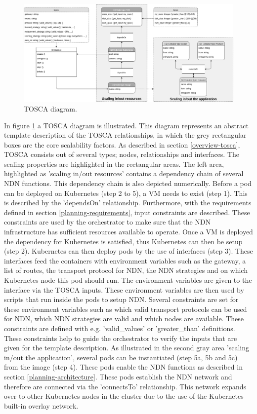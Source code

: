 \begin{figure}[H]
\centering
\includegraphics[width=\columnwidth]{Images/tosca-diagram.png}
\caption{TOSCA diagram.}
\label{fig:tosca-diagram}
\end{figure}

In figure \ref{fig:tosca-diagram} a TOSCA diagram is illustrated. This diagram represents an abstract template description of the TOSCA relationships, in which the grey rectangular boxes are the core scalability factors. As described in section \ref{overview-tosca}, TOSCA consists out of several types; nodes, relationships and interfaces. The scaling properties are highlighted in the rectangular areas. The left area, highlighted as 'scaling in/out resources' contains a dependency chain of several NDN functions. This dependency chain is also depicted numerically. Before a pod can be deployed on Kubernetes (step 2 to 5), a VM needs to exist (step 1). This is described by the 'dependsOn' relationship. Furthermore, with the requirements defined in section \ref{planning-requirements}, input constraints are described. These constraints are used by the orchestrator to make sure that the NDN infrastructure has sufficient resources available to operate. Once a VM is deployed the dependency for Kubernetes is satisfied, thus Kubernetes can then be setup (step 2). Kubernetes can then deploy pods by the use of interfaces (step 3). These interfaces feed the containers with environment variables such as the gateway, a list of routes, the transport protocol for NDN, the NDN strategies and on which Kubernetes node this pod should run. The environment variables are given to the interface via the TOSCA inputs. These environment variables are then used by scripts that run inside the pods to setup NDN. Several constraints are set for these environment variables such as which valid transport protocols can be used for NDN, which NDN strategies are valid and which nodes are available. These constraints are defined with e.g. 'valid\_values' or 'greater\_than' definitions. These constraints help to guide the orchestrator to verify the inputs that are given for the template description. As illustrated in the second gray area 'scaling in/out the application', several pods can be instantiated (step 5a, 5b and 5c) from the image (step 4). These pods enable the NDN functions as described in section \ref{planning-architecture}. These pods establish the NDN network and therefore are connected via the 'connectsTo' relationship. This network expands over to other Kubernetes nodes in the cluster due to the use of the Kubernetes built-in overlay network.

